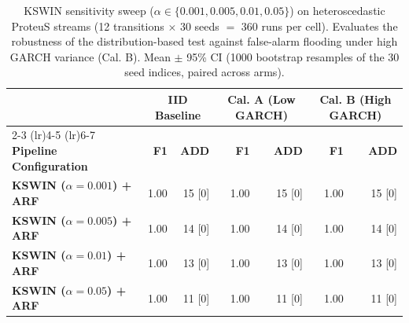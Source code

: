\begin{table}[t]
  \centering
  \caption{KSWIN sensitivity sweep ($\alpha \in \{0.001, 0.005, 0.01, 0.05\}$) on heteroscedastic ProteuS streams (12 transitions $\times$ 30 seeds $=$ 360 runs per cell). Evaluates the robustness of the distribution-based test against false-alarm flooding under high GARCH variance (Cal. B). Mean $\pm$ 95\% CI (1000 bootstrap resamples of the 30 seed indices, paired across arms).}
  \label{tab:kswin_alpha_sweep}
  \begin{tabular}{@{}lrrrrrr@{}}
    \toprule
                                                   & \multicolumn{2}{c}{\textbf{IID Baseline}} & \multicolumn{2}{c}{\textbf{Cal. A (Low GARCH)}} & \multicolumn{2}{c}{\textbf{Cal. B (High GARCH)}} \\
    \cmidrule(lr){2-3} \cmidrule(lr){4-5} \cmidrule(lr){6-7}
    \textbf{Pipeline Configuration}                & \textbf{F1} & \textbf{ADD} & \textbf{F1} & \textbf{ADD} & \textbf{F1} & \textbf{ADD} \\
    \midrule
    \textbf{KSWIN ($\alpha = 0.001$) + ARF}        & 1.00 & 15 [0] & 1.00 & 15 [0] & 1.00 & 15 [0] \\
    \textbf{KSWIN ($\alpha = 0.005$) + ARF}        & 1.00 & 14 [0] & 1.00 & 14 [0] & 1.00 & 14 [0] \\
    \textbf{KSWIN ($\alpha = 0.01$) + ARF}         & 1.00 & 13 [0] & 1.00 & 13 [0] & 1.00 & 13 [0] \\
    \textbf{KSWIN ($\alpha = 0.05$) + ARF}         & 1.00 & 11 [0] & 1.00 & 11 [0] & 1.00 & 11 [0] \\
    \bottomrule
  \end{tabular}
\end{table}
